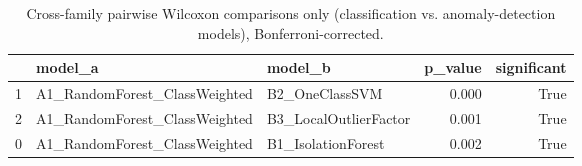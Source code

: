 \begin{table}[htbp]
\caption{Cross-family pairwise Wilcoxon comparisons only (classification vs. anomaly-detection models), Bonferroni-corrected.}
\label{tab:cross_family_wilcoxon}
\begin{tabular}{lllrr}
\toprule
 & model\_a & model\_b & p\_value & significant \\
\midrule
1 & A1\_RandomForest\_ClassWeighted & B2\_OneClassSVM & 0.000 & True \\
2 & A1\_RandomForest\_ClassWeighted & B3\_LocalOutlierFactor & 0.001 & True \\
0 & A1\_RandomForest\_ClassWeighted & B1\_IsolationForest & 0.002 & True \\
\bottomrule
\end{tabular}
\end{table}
